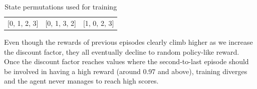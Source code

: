 \begin{table}
	\centering
	\caption{State permutations used for training}
	\label{tab:5perms}
	\bgroup
	\def\arraystretch{1.5}
	\begin{tabular}{c|c|c}
		[0, 1, 2, 3] & [0, 1, 3, 2] & [1, 0, 2, 3] \\
	\end{tabular}
	\egroup
\end{table}

Even though the rewards of previous episodes clearly climb higher as
we increase the discount factor, they all eventually decline to random
policy-like reward. Once the discount factor reaches values where the
second-to-last episode should be involved in having a high reward (around
0.97 and above), training diverges and the agent never manages to reach
high scores.\\

